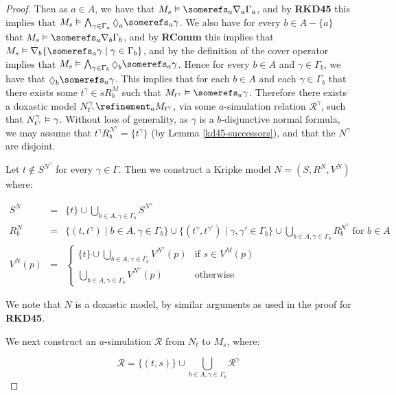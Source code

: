 \begin{proof}
Then as $a \in A$, we have that $M_s \entails \somerefs_a \covers_a \Gamma_a$,
and by {\bf RKD45} this implies that $M_s \entails \bigwedge_{\gamma \in
\Gamma_a} \suspects_a \somerefs_a \gamma$. We also have for every $b \in A -
\{a\}$ that $M_s \entails \somerefs_a \covers_b \Gamma_b$, and by {\bf RComm}
this implies that $M_s \entails \covers_b \{\somerefs_a \gamma \mid \gamma \in
\Gamma_b\}$, and by the definition of the cover operator implies that $M_s
\entails \bigwedge_{\gamma \in \Gamma_b} \suspects_b \somerefs_a \gamma$.  Hence
for every $b \in A$ and $\gamma \in \Gamma_b$, we have that $\suspects_b
\somerefs_a \gamma$. This implies that for each $b \in A$ and each $\gamma \in
\Gamma_b$ that there exists some $t^{\gamma} \in sR^M_b$ such that $M_{t^\gamma}
\entails \somerefs_a \gamma$. Therefore there exists a doxastic model
$N^\gamma_{t^\gamma} \refinement_a M_{t^\gamma}$, via some $a$-simulation
relation $\mathcal{R}^\gamma$, such that $N^\gamma_{t^\gamma} \vDash \gamma$.
Without loss of generality, as $\gamma$ is a $b$-disjunctive normal formula, we
may assume that $t^\gamma R^{N^\gamma}_b = \{t^\gamma\}$ (by Lemma
\ref{kd45-successors}), and that the $N^\gamma$ are disjoint.

Let $t \notin S^{N^\gamma}$ for every $\gamma \in \Gamma$.
Then we construct a Kripke model $N = (S, R^N, V^N)$ where:

\begin{eqnarray*}
S^N &=& \{t\} \cup \bigcup_{b \in A, \gamma \in \Gamma_b} S^{N^\gamma}\\
R^N_b &=& \{(t, t^{\gamma}) \mid b \in A, \gamma \in \Gamma_b\} 
\cup \{(t^\gamma, t^{\gamma'}) \mid \gamma, \gamma' \in \Gamma_b\}
\cup \bigcup_{b \in A, \gamma \in \Gamma_b} R^{N^\gamma}_b \text{ for $b \in A$}\\
V^N(p) &=& 
\begin{cases}
\{t\} \cup \bigcup_{b \in A, \gamma \in \Gamma_b} V^{N^\gamma}(p) & \text{if $s
\in V^M(p)$}\\
\bigcup_{b \in A, \gamma \in \Gamma_b} V^{N^\gamma}(p) & \text{otherwise}
\end{cases}
\end{eqnarray*}

We note that $N$ is a doxastic model, by similar arguments as used in the proof
for {\bf RKD45}.

We next construct an $a$-simulation $\mathcal{R}$ from $N_t$ to $M_s$, where:

$$\mathcal{R} = \{(t, s)\} \cup \bigcup_{b \in A, \gamma \in \Gamma_b}
\mathcal{R}^\gamma$$


\end{proof}
